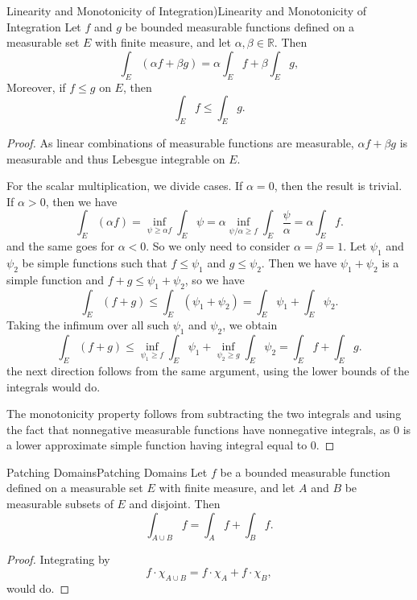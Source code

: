 \documentclass[../main.tex]{subfiles}
\begin{document}
\begin{theorem}{Linearity and Monotonicity of Integration)}{Linearity and Monotonicity of Integration}
	Let $f$ and $g$ be bounded measurable functions defined on a measurable set $E$ with finite measure, and let $\alpha, \beta \in \mathbb{R}$. Then
	\begin{equation}
		\int_E (\alpha f + \beta g) = \alpha \int_E f + \beta \int_E g,
	\end{equation}
	Moreover, if $f \leq g$ on $E$, then
	\begin{equation}
		\int_E f \leq \int_E g.
	\end{equation}
\end{theorem}
\begin{proof}
	As linear combinations of measurable functions are measurable, $\alpha f + \beta g$ is measurable and thus Lebesgue integrable on $E$.

	For the scalar multiplication, we divide cases. If $\alpha = 0$, then the result is trivial. If $\alpha > 0$, then we have
	\begin{equation*}
		\int_E (\alpha f) = \inf_{\psi \geq \alpha f} \int_E \psi = \alpha \inf_{\psi / \alpha \geq f} \int_E \frac{\psi}{\alpha} = \alpha \int_E f.
	\end{equation*}
	and the same goes for $\alpha < 0$. So we only need to consider $\alpha = \beta = 1$. Let $\psi_1$ and $\psi_2$ be simple functions such that $f \leq \psi_1$ and $g \leq \psi_2$. Then we have $\psi_1 + \psi_2$ is a simple function and $f + g \leq \psi_1 + \psi_2$, so we have
	\begin{equation*}
		\int_E (f + g) \leq \int_E (\psi_1 + \psi_2) = \int_E \psi_1 + \int_E \psi_2.
	\end{equation*}
	Taking the infimum over all such $\psi_1$ and $\psi_2$, we obtain
	\begin{equation*}
		\int_E (f + g) \leq \inf_{\psi_1 \geq f} \int_E \psi_1 + \inf_{\psi_2 \geq g} \int_E \psi_2 = \int_E f + \int_E g.
	\end{equation*}
	the next direction follows from the same argument, using the lower bounds of the integrals would do.

	The monotonicity property follows from subtracting the two integrals and using the fact that nonnegative measurable functions have nonnegative integrals, as $0$ is a lower approximate simple function having integral equal to $0$.
\end{proof}

\begin{proposition}{Patching Domains}{Patching Domains}
	Let $f$ be a bounded measurable function defined on a measurable set $E$ with finite measure, and let $A$ and $B$ be measurable subsets of $E$ and disjoint. Then
	\begin{equation}
		\int_{A \cup B} f = \int_A f + \int_B f.
	\end{equation}
\end{proposition}
\begin{proof}
	Integrating by
	\begin{equation*}
		f \cdot \chi_{A \cup B} = f \cdot \chi_A + f \cdot \chi_B,
	\end{equation*}
	would do.
\end{proof}
\end{document}
